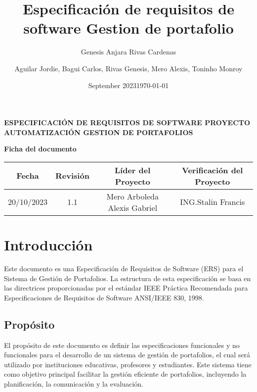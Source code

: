 \documentclass[11pt]{article}
\title{Especificación de requisitos de software}
\author{Genesis Anjara Rivas Cardenas}
\date{September 2023}
\title{ Gestion de portafolio }
\author { Aguilar Jordie, Bagui Carlos, Rivas Genesis, Mero Alexis, Toninho Monroy }
\date{\today}
\begin{document}
\newpage

\vspace{2cm} 
\begin{center}
\Huge 
\textbf{ESPECIFICACIÓN DE REQUISITOS DE SOFTWARE
PROYECTO AUTOMATIZACIÓN GESTION DE
PORTAFOLIOS}
\end{center}

\newpage

\Huge
\textbf{Ficha del documento}
\vspace{7cm}

\normalsize

\begin{tabular}{|c|c|c|c|}
\hline
Fecha & Revisión & Líder del Proyecto & Verificación del Proyecto \\
\hline
\multirow{8}{*}{20/10/2023} & \multirow{8}{*}{1.1} & \multirow{8}{*}{Mero Arboleda Alexis Gabriel} & \multirow{8}{*}{ING.Stalin Francis} \\
& & & \\
& & & \\
& & & \\
& & & \\
& & & \\
& & & \\
& & & \\
\hline
\end{tabular}

\newpage


\section{\textbf{Introducción}}

Este documento es una Especificación de Requisitos de Software (ERS)
para el Sistema de Gestión de Portafolios. La estructura de esta 
especificación se basa en las directrices proporcionadas por el
estándar IEEE Práctica Recomendada para Especificaciones de 
Requisitos de Software ANSI/IEEE 830, 1998.

\subsection{\textbf{Propósito}}

El propósito de este documento es definir las especificaciones 
funcionales y no funcionales para el desarrollo de un sistema de
gestión de portafolios, el cual será utilizado por instituciones
educativas, profesores y estudiantes. Este sistema tiene como
objetivo principal facilitar la gestión eficiente de portafolios,
incluyendo la planificación, la comunicación y la evaluación.
\end{document}
